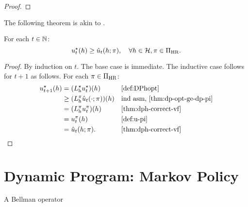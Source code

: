 \begin{proof}
\end{proof}

The following theorem is akin to \citep[theorem~4.3.2]{Puterman2005}.
\begin{theorem}\label{thm:dph-opt-vf-opt}
For each $t\in \mathbb{N}$:
  \[
    u^{\star}_t(h)
    \ge 
    \hat{u}_t(h; \pi), \quad \forall h\in \mathcal{H}, \pi\in \Pi_{\mathrm{HR}}.
  \]
\end{theorem}
\begin{proof}
  By induction on $t$. The base case is immediate. The inductive case follows for $t+1$ as follows. For each $\pi\in \Pi_{\mathrm{HR}}$:
  \begin{align*}
    u_{t+1}\opt(h)
    &= (L_{\mathrm{h}}\opt u_t\opt)(h) && \text{\cref{def:DPhopt}} \\
    &\ge (L_{\mathrm{h}}^{\pi} \hat{u}_t(\cdot; \pi))(h) && \text{ind asm, \cref{thm:dp-opt-ge-dp-pi}} \\
    &= (L_{\mathrm{h}}^{\pi} u_t^{\pi})(h) && \text{\cref{thm:dph-correct-vf}} \\
    &= u_t^{\pi}(h) && \text{\cref{def:u-pi}} \\
    &= \hat{u}_t(h; \pi). && \text{\cref{thm:dph-correct-vf}} \\
  \end{align*}
\end{proof}

\section{Dynamic Program: Markov Policy}

\begin{definition}
A Bellman operator   
\end{definition}



\label{def:uopt}
